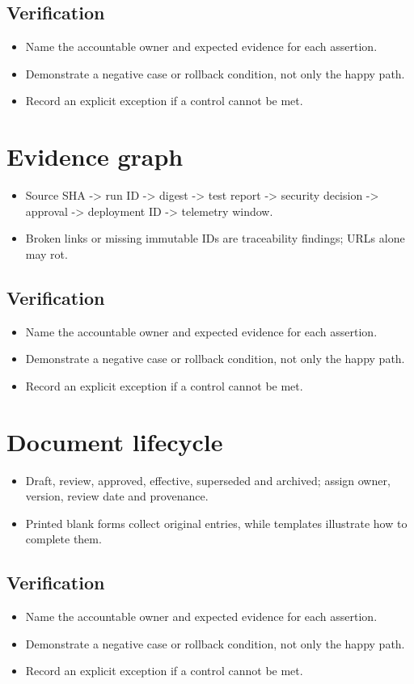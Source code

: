 \documentclass[10pt,letterpaper]{article}
\begin{document}
\subsection{Verification}
\begin{itemize}
\item Name the accountable owner and expected evidence for each assertion.
\item Demonstrate a negative case or rollback condition, not only the happy path.
\item Record an explicit exception if a control cannot be met.
\end{itemize}


\section{Evidence graph}
\begin{itemize}
\item Source SHA -> run ID -> digest -> test report -> security decision -> approval -> deployment ID -> telemetry window.
\item Broken links or missing immutable IDs are traceability findings; URLs alone may rot.
\end{itemize}
\subsection{Verification}
\begin{itemize}
\item Name the accountable owner and expected evidence for each assertion.
\item Demonstrate a negative case or rollback condition, not only the happy path.
\item Record an explicit exception if a control cannot be met.
\end{itemize}


\section{Document lifecycle}
\begin{itemize}
\item Draft, review, approved, effective, superseded and archived; assign owner, version, review date and provenance.
\item Printed blank forms collect original entries, while templates illustrate how to complete them.
\end{itemize}
\subsection{Verification}
\begin{itemize}
\item Name the accountable owner and expected evidence for each assertion.
\item Demonstrate a negative case or rollback condition, not only the happy path.
\item Record an explicit exception if a control cannot be met.
\end{itemize}
\end{document}
